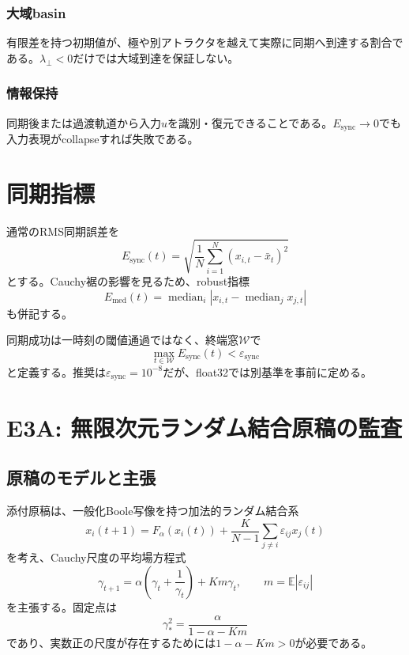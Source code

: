 \documentclass[a4paper,11pt,oneside,openany]{ltjsbook}
\newcommand{\E}{\mathbb{E}}
\newcommand{\median}{\operatorname{median}}
\begin{document}
\subsubsection*{大域basin}
有限差を持つ初期値が、極や別アトラクタを越えて実際に同期へ到達する割合である。\(\lambda_\perp<0\)だけでは大域到達を保証しない。

\subsubsection*{情報保持}
同期後または過渡軌道から入力\(u\)を識別・復元できることである。\(E_{\mathrm{sync}}\to0\)でも入力表現がcollapseすれば失敗である。

\section{同期指標}

通常のRMS同期誤差を
\begin{equation}
  E_{\mathrm{sync}}(t)
  =\sqrt{\frac1N\sum_{i=1}^{N}(x_{i,t}-\bar x_t)^2}
  \label{eq:sync_rms}
\end{equation}
とする。Cauchy裾の影響を見るため、robust指標
\begin{equation}
  E_{\mathrm{med}}(t)
  =\median_i |x_{i,t}-\median_jx_{j,t}|
  \label{eq:sync_robust}
\end{equation}
も併記する。

同期成功は一時刻の閾値通過ではなく、終端窓\(\mathcal W\)で
\begin{equation}
  \max_{t\in\mathcal W}E_{\mathrm{sync}}(t)<\varepsilon_{\mathrm{sync}}
  \label{eq:sustained_sync}
\end{equation}
と定義する。推奨は\(\varepsilon_{\mathrm{sync}}=10^{-8}\)だが、float32では別基準を事前に定める。

\section{E3A: 無限次元ランダム結合原稿の監査}

\subsection{原稿のモデルと主張}

添付原稿は、一般化Boole写像を持つ加法的ランダム結合系
\begin{equation}
  x_i(t+1)
  =F_\alpha(x_i(t))
   +\frac{K}{N-1}\sum_{j\ne i}\varepsilon_{ij}x_j(t)
  \label{eq:source_random_additive_gcm}
\end{equation}
を考え、Cauchy尺度の平均場方程式
\begin{equation}
  \gamma_{t+1}
  =\alpha\left(\gamma_t+\frac1{\gamma_t}\right)
   +Km\gamma_t,
  \qquad m=\E|\varepsilon_{ij}|
  \label{eq:source_scale_meanfield}
\end{equation}
を主張する\cite{infinite_sync}。固定点は
\begin{equation}
  \gamma_*^2
  =\frac{\alpha}{1-\alpha-Km}
  \label{eq:source_random_gamma}
\end{equation}
であり、実数正の尺度が存在するためには\(1-\alpha-Km>0\)が必要である。
\end{document}
